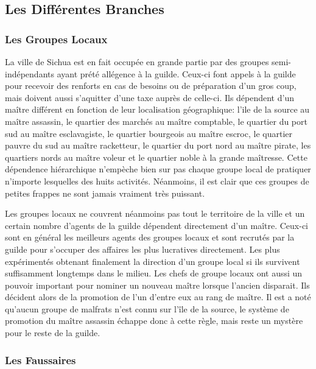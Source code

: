 \subsection{Les Différentes Branches}

\subsubsection{Les Groupes Locaux}

La ville de Sichua est en fait occupée en grande partie par des groupes
semi-indépendants ayant prété allégence à la guilde. Ceux-ci font appels 
à la guilde pour recevoir des renforts en cas de besoins ou de préparation 
d'un gros coup, mais doivent aussi s'aquitter d'une taxe auprès de celle-ci. Ils dépendent
d'un maître différent en fonction de leur localisation géographique:
l'ile de la source au maître assassin, le quartier des marchés au maître
comptable, le quartier du port sud au maître esclavagiste, le quartier 
bourgeois au maître escroc, le quartier pauvre du sud au maître racketteur,
le quartier du port nord au maître pirate, les quartiers nords au maître 
voleur et le quartier noble à la grande maîtresse. Cette dépendence hiérarchique 
n'empèche bien sur pas chaque groupe local de pratiquer n'importe lesquelles des huits
activités. Néanmoins, il est clair que ces groupes de petites frappes ne sont
jamais vraiment très puissant. 

Les groupes locaux ne couvrent néanmoins pas tout le territoire de la ville
et un certain nombre d'agents de la guilde dépendent directement d'un maître.
Ceux-ci sont en général les meilleurs agents des groupes locaux et sont recrutés
par la guilde pour s'occuper des affaires les plus lucratives directement. 
Les plus expérimentés obtenant finalement la direction d'un groupe local
si ils survivent suffisamment longtemps dans le milieu. Les chefs de groupe
locaux ont aussi un pouvoir important pour nominer un nouveau maître
lorsque l'ancien disparait. Ils décident alors de la promotion de l'un d'entre 
eux au rang de maître. Il est a noté qu'aucun groupe de malfrats n'est connu 
sur l'île de la source, le système de promotion du maître assassin échappe donc
à cette règle, mais reste un mystère pour le reste de la guilde.



\subsubsection{Les Faussaires}

